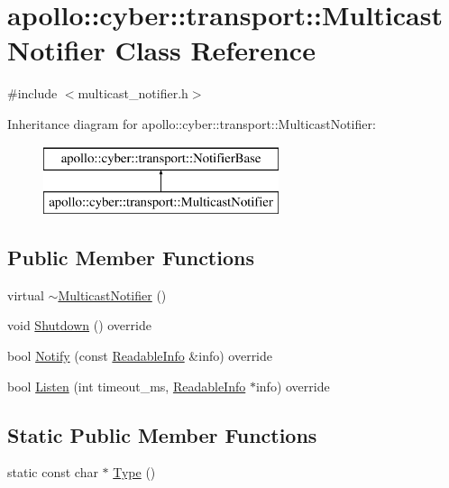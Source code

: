\hypertarget{classapollo_1_1cyber_1_1transport_1_1MulticastNotifier}{\section{apollo\-:\-:cyber\-:\-:transport\-:\-:Multicast\-Notifier Class Reference}
\label{classapollo_1_1cyber_1_1transport_1_1MulticastNotifier}
}


{\ttfamily \#include $<$multicast\-\_\-notifier.\-h$>$}

Inheritance diagram for apollo\-:\-:cyber\-:\-:transport\-:\-:Multicast\-Notifier\-:\begin{figure}[H]
\begin{center}
\leavevmode
\includegraphics[height=2.000000cm]{classapollo_1_1cyber_1_1transport_1_1MulticastNotifier}
\end{center}
\end{figure}
\subsection*{Public Member Functions}
\begin{DoxyCompactItemize}
\item 
virtual \hyperlink{classapollo_1_1cyber_1_1transport_1_1MulticastNotifier_a7e18b50ee9cb30f00919b00dd5a7c18b}{$\sim$\-Multicast\-Notifier} ()
\item 
void \hyperlink{classapollo_1_1cyber_1_1transport_1_1MulticastNotifier_ad93fdda54a6d3064dc613ea558f3be2b}{Shutdown} () override
\item 
bool \hyperlink{classapollo_1_1cyber_1_1transport_1_1MulticastNotifier_a646ced665934a2f9748d2739badf862b}{Notify} (const \hyperlink{classapollo_1_1cyber_1_1transport_1_1ReadableInfo}{Readable\-Info} \&info) override
\item 
bool \hyperlink{classapollo_1_1cyber_1_1transport_1_1MulticastNotifier_a6b30e7919744b11f756870428cf6ea8f}{Listen} (int timeout\-\_\-ms, \hyperlink{classapollo_1_1cyber_1_1transport_1_1ReadableInfo}{Readable\-Info} $\ast$info) override
\end{DoxyCompactItemize}
\subsection*{Static Public Member Functions}
\begin{DoxyCompactItemize}
\item 
static const char $\ast$ \hyperlink{classapollo_1_1cyber_1_1transport_1_1MulticastNotifier_a9d0c06c12c0a762d831ec471fe573a33}{Type} ()
\end{DoxyCompactItemize}
